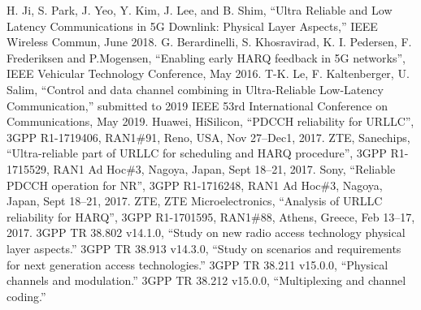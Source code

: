 \documentclass[conference]{IEEEtran}
\begin{document}
\begin{thebibliography}{00}
 H. Ji, S. Park, J. Yeo, Y. Kim, J. Lee, and B. Shim, ``Ultra Reliable and Low Latency Communications in 5G Downlink: Physical Layer Aspects,''  IEEE Wireless Commun, June 2018.
 G. Berardinelli, S. Khosravirad, K. I. Pedersen, F. Frederiksen and P.Mogensen, ``Enabling early HARQ feedback in 5G networks'', IEEE Vehicular Technology Conference, May 2016.
 T-K. Le, F. Kaltenberger, U. Salim, ``Control and data channel combining in Ultra-Reliable Low-Latency Communication,'' submitted to 2019 IEEE 53rd International Conference on Communications, May 2019.
 Huawei, HiSilicon, ``PDCCH reliability for URLLC'', 3GPP R1-1719406, RAN1\#91, Reno, USA, Nov 27--Dec1, 2017.
 ZTE, Sanechips, ``Ultra-reliable part of URLLC for scheduling and HARQ procedure'', 3GPP R1-1715529, RAN1 Ad Hoc\#3, Nagoya, Japan, Sept 18--21, 2017.
 Sony, ``Reliable PDCCH operation for NR'', 3GPP R1-1716248, RAN1 Ad Hoc\#3, Nagoya, Japan, Sept 18--21, 2017.
 ZTE, ZTE Microelectronics, ``Analysis of URLLC reliability for HARQ'', 3GPP R1-1701595, RAN1\#88, Athens, Greece, Feb 13--17, 2017.
 3GPP TR 38.802 v14.1.0, ``Study on new radio access technology physical layer aspects.''
 3GPP TR 38.913 v14.3.0, ``Study on scenarios and requirements for next generation access technologies.''
 3GPP TR 38.211 v15.0.0, ``Physical channels and modulation.''
 3GPP TR 38.212 v15.0.0, ``Multiplexing and channel coding.''

\end{thebibliography}
\vspace{12pt}
\end{document}
